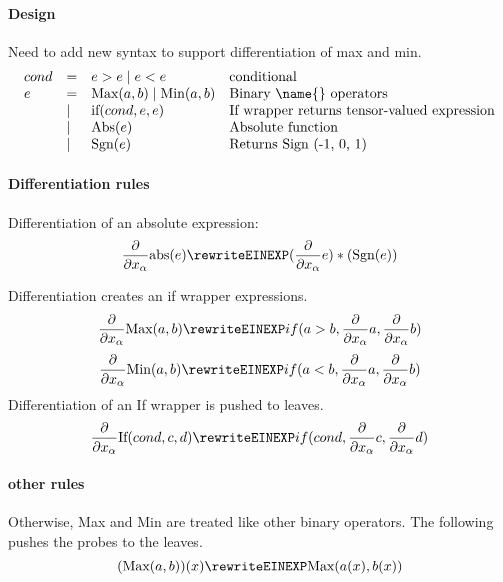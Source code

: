 
\paragraph{Design}
Need to add new syntax to support differentiation of max and min.
$$\begin{array}{llll}
cond &=& e>e \mid e<e & \text{conditional }\\
e&=&  \text{Max}(a,b)  \mid \text{Min}(a,b) & \text{Binary \name{} operators}\\
&\mid & \text{if}(cond, e, e)  &\text{If wrapper returns tensor-valued expression}\\
&\mid &\text{Abs}(e) &\text{Absolute function}\\
&\mid &\text{Sgn} (e)& \text{Returns Sign (-1, 0, 1)}\\
\end{array}$$

 \paragraph{Differentiation rules}
 Differentiation of an absolute expression:
  $$\frac{\partial}{\partial x_\alpha} \text{abs}(e) \rewriteEINEXP
( \frac{\partial}{\partial x_\alpha} e) *(\text{Sgn} (e))
 $$ 

Differentiation creates an if wrapper expressions.
 $$\frac{\partial}{\partial x_\alpha} \text{Max}(a,b) \rewriteEINEXP if(a>b, \frac{\partial}{\partial x_\alpha}a, \frac{\partial}{\partial x_\alpha}b)  $$
 $$\frac{\partial}{\partial x_\alpha}\text{Min}(a,b) \rewriteEINEXP if(a<b, \frac{\partial}{\partial x_\alpha}  a, \frac{\partial}{\partial x_\alpha} b)  $$
  Differentiation of an If wrapper is pushed to leaves.
   $$\frac{\partial}{\partial x_\alpha} \text{If}(cond, c,d) \rewriteEINEXP if(cond, \frac{\partial}{\partial x_\alpha}c, \frac{\partial}{\partial x_\alpha}d)  $$
  \paragraph{other  rules}
Otherwise, Max and Min are treated like  other binary operators. The following pushes the probes to the leaves.
  $$ (\text{Max}(a,b))(x) \rewriteEINEXP \text{Max}(a(x),  b(x)) $$

